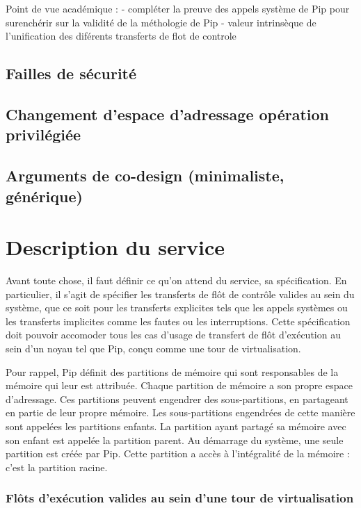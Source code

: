 		Point de vue académique :
			- compléter la preuve des appels système de Pip pour surenchérir sur la validité de la méthologie de Pip
			- valeur intrinsèque de l'unification des diférents transferts de flot de controle
		\subsection{Failles de sécurité}
		\subsection{Changement d'espace d'adressage opération privilégiée}
		\subsection{Arguments de co-design (minimaliste, générique)}
			

	\section{Description du service}

	Avant toute chose, il faut définir ce qu'on attend du service, sa spécification. En particulier, il s'agit de spécifier les transferts de flôt de contrôle valides au sein du système, que ce soit pour les transferts explicites tels que les appels systèmes ou les transferts implicites comme les fautes ou les interruptions. Cette spécification doit pouvoir accomoder tous les cas d'usage de transfert de flôt d'exécution au sein d'un noyau tel que Pip, conçu comme une tour de virtualisation.
	
	Pour rappel, Pip définit des partitions de mémoire qui sont responsables de la mémoire qui leur est attribuée. Chaque partition de mémoire a son propre espace d'adressage. Ces partitions peuvent engendrer des sous-partitions, en partageant en partie de leur propre mémoire. Les sous-partitions engendrées de cette manière sont appelées les partitions enfants. La partition ayant partagé sa mémoire avec son enfant est appelée la partition parent. Au démarrage du système, une seule partition est créée par Pip. Cette partition a accès à l'intégralité de la mémoire : c'est la partition racine.

	\subsubsection{Flôts d'exécution valides au sein d'une tour de virtualisation}

